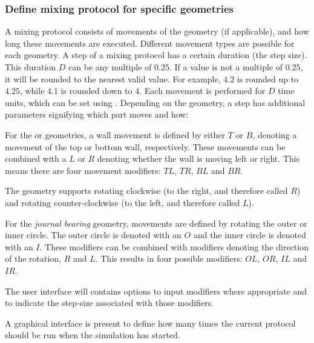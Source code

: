 \subsubsection{Define mixing protocol for specific geometries}
A mixing protocol consists of movements of the geometry (if applicable), and how long these movements are executed. Different movement types are possible for each geometry. A step of a mixing protocol has a certain duration (the step size). This duration $D$ can be any multiple of $0.25$. If a value is not a multiple of $0.25$, it will be rounded to the nearest valid value. For example, $4.2$ is rounded up to $4.25$, while $4.1$ is rounded down to $4$. Each movement is performed for $D$ time units, which can be set using . Depending on the geometry, a step has additional parameters signifying which part moves and how:

\fpstartparagraph{} For the  or  geometries, a wall movement is defined by either $T$ or $B$, denoting a movement of the top or bottom wall, respectively. These movements can be combined with a $L$ or $R$ denoting whether the wall is moving left or right. This means there are four movement modifiers: $TL$, $TR$, $BL$ and $BR$. 

The  geometry supports rotating clockwise (to the right, and therefore called $R$) and rotating counter-clockwise (to the left, and therefore called $L$).

For the \emph{journal bearing} geometry, movements are defined by rotating the outer or inner circle. The outer circle is denoted with an $O$ and the inner circle is denoted with an $I$. These modifiers can be combined with modifiers denoting the direction of the rotation, $R$ and $L$. This results in four possible modifiers: $OL$, $OR$, $IL$ and $IR$.

The user interface will contains options to input modifiers where appropriate and to indicate the step-size associated with those modifiers.

\fpstartparagraph{} A graphical interface is present to define how many times the current protocol should be run when the simulation has started.




